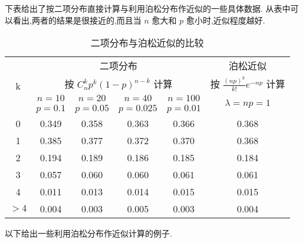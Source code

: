 下表给出了按二项分布直接计算与利用泊松分布作近似的一些具体数据.
从表中可以看出,两者的结果是很接近的,而且当 $ n $ 愈大和 $ p $ 愈小时,近似程度越好.

\begin{table}[htbp]
	\centering
	\caption{二项分布与泊松近似的比较}
	\begin{tabular}{c|c|c|c|c|c}
		\toprule
		\multirow{4}{*}{k}   & \multicolumn{4}{c|}{二项分布}                                                                  & 泊松近似                                  \\
		& \multicolumn{4}{c|}{按 $ C_{n}^{k} p^{k}(1-p)^{n-k} $ 计算}                                     & 按 $ \frac{(n p)^{k}}{k !} e^{-n p} $ 计算 \\\cline{2-6}
		& $ n=10 $ & $ n=20 $ & $ n=40 $ & $ n=100 $ & \multirow{2}{*}{ $ \lambda=n p=1 $ }      \\
		& $ p=0.1 $ & $ p=0.05 $ & $ p=0.025 $ & $ p=0.01 $ &                                       \\\midrule
		0                    & 0.349                & 0.358                & 0.363                & 0.366                & 0.368                                 \\
		1                    & 0.385                & 0.377                & 0.372                & 0.370                & 0.368                                 \\
		2                    & 0.194                & 0.189                & 0.186                & 0.185                & 0.184                                 \\
		3                    & 0.057                & 0.060                & 0.060                & 0.061                & 0.061                                 \\
		4                    & 0.011                & 0.013                & 0.014                & 0.015                & 0.015                                 \\
		 $ >4 $ & 0.004                & 0.003                & 0.005                & 0.003                & 0.004                                 \\\bottomrule           
	\end{tabular}
	\label{tab:2.4.3}
\end{table}

以下给出一些利用泊松分布作近似计算的例子.

